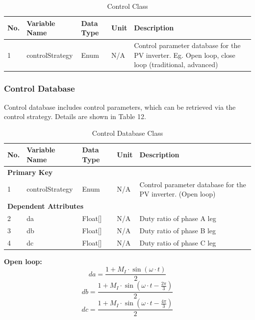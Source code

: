 \documentclass{article}
\begin{document}
\begin{table}[h]
\centering
\caption{Control Class}
\begin{tabular}{|l|l|l|l|p{6cm}|}
\hline
\textbf{No.} & \textbf{Variable Name} & \textbf{Data Type} & \textbf{Unit} & \textbf{Description} \\ \hline
1 & controlStrategy & Enum & N/A & Control parameter database for the PV inverter. Eg. Open loop, close loop (traditional, advanced) \\ \hline
\end{tabular}
\end{table}

\subsubsection{Control Database}
Control database includes control parameters, which can be retrieved via the control strategy. Details are shown in Table 12.

\begin{table}[h]
\centering
\caption{Control Database Class}
\begin{tabular}{|l|l|l|l|p{6cm}|}
\hline
\textbf{No.} & \textbf{Variable Name} & \textbf{Data Type} & \textbf{Unit} & \textbf{Description} \\ \hline
\multicolumn{5}{|l|}{\textbf{Primary Key}} \\ \hline
1 & controlStrategy & Enum & N/A & Control parameter database for the PV inverter. (Open loop) \\ \hline
\multicolumn{5}{|l|}{\textbf{Dependent Attributes}} \\ \hline
2 & da & Float[] & N/A & Duty ratio of phase A leg \\ \hline
3 & db & Float[] & N/A & Duty ratio of phase B leg \\ \hline
4 & dc & Float[] & N/A & Duty ratio of phase C leg \\ \hline
\end{tabular}
\end{table}

\textbf{Open loop:}
\begin{equation}
da = \frac{1+M_I \cdot \sin(\omega \cdot t)}{2}
\end{equation}
\begin{equation}
db = \frac{1+M_I \cdot \sin(\omega \cdot t - \frac{2\pi}{3})}{2}
\end{equation}
\begin{equation}
dc = \frac{1+M_I \cdot \sin(\omega \cdot t - \frac{4\pi}{3})}{2}
\end{equation}
\end{document}
